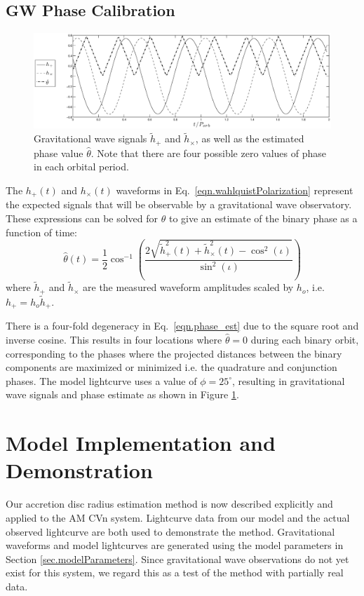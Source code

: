 \documentclass[preprint2]{aastex}
\begin{document}
\subsection{GW Phase Calibration}
\label{sec.GWcal}

\begin{figure}[t]
\centering
\includegraphics[width=\textwidth]{./GWphase.eps}
\caption{Gravitational wave signals $\tilde{h}_+$ and
$\tilde{h}_{\times}$, as well as the estimated phase value
$\hat{\theta}$. Note that there are four possible zero values of
phase in each orbital period.}
\label{fig.GWphase}
\end{figure}


The $h_+(t)$ and $h_\times(t)$ waveforms in Eq.\
\ref{eqn.wahlquistPolarization} represent the expected signals that
will be observable by a gravitational wave observatory.  These
expressions can be solved for $\theta$ to give an estimate of the
binary phase as a function of time:
\begin{equation} \label{eqn.phase_est}
   \hat{\theta}(t) = \dfrac{1}{2}\cos^{-1}\left (
   \dfrac{2\sqrt{\tilde{h}_+^2(t) + \tilde{h}_\times^2(t) -
   \cos^2(\iota)}}{\sin^2(\iota)}\right )
\end{equation}
where $\tilde{h}_+$ and $\tilde{h}_{\times}$ are the measured
waveform amplitudes scaled by $h_{o}$, i.e. $h_+ = h_{o}\tilde{h}_+$.

There is a four-fold degeneracy in Eq.\ \ref{eqn.phase_est} due
to the square root and inverse cosine. This results in four locations
where $\hat{\theta}=0$ during each binary orbit, corresponding to the
phases where the projected distances between the binary components are maximized or minimized i.e. the quadrature and conjunction phases. 
The model lightcurve uses a value of $\phi=25^{\circ}$, resulting in
gravitational wave signals and phase estimate as shown in Figure
\ref{fig.GWphase}.



\section{Model Implementation and Demonstration}\label{sec.demon}
Our accretion disc radius estimation method is now described explicitly and applied to the AM CVn system.  Lightcurve data from our model and the actual observed lightcurve \citet{1998ApJ...493L.105H} are both used to demonstrate the method.
Gravitational waveforms and model lightcurves are generated
using the model parameters in Section \ref{sec.modelParameters}.
Since gravitational wave observations do not yet exist for this
system, we regard this as a test of the method with partially real
data.
\end{document}
